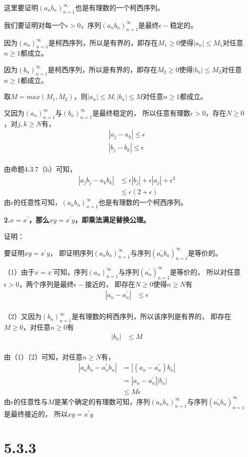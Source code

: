 \documentclass{article}
\theoremstyle{mystyle}
\begin{document}
这里要证明$(a_nb_n)_{n=1}^\infty$也是有理数的一个柯西序列。

我们要证明对每一个$\epsilon > 0$，序列$(a_nb_n)_{n=1}^\infty$是最终$\epsilon-$稳定的。

因为$(a_n)_{n=1}^\infty$是柯西序列，所以是有界的，即存在$M_1 \ge 0$使得$|a_n|\leq M_1$对任意$n \geq 1$都成立。

因为$(b_n)_{n=1}^\infty$是柯西序列，所以是有界的，即存在$M_2 \ge 0$使得$|b_n|\leq M_2$对任意$n \geq 1$都成立。

取$M=max(M_1,M_2)$，则$|a_n|\leq M, |b_n| \leq M$对任意$n \geq 1$都成立。

又因为$(a_n)_{n=1}^\infty$与$(b_n)_{n=1}^\infty$是最终稳定的，
所以任意有理数$\epsilon>0$，存在$N \geq 0$，对$j,k \geq N$有，
\begin{align*}
  |a_j - a_k| \leq \epsilon \\
  |b_j - b_k| \leq \epsilon \\
\end{align*}

由命题4.3.7（h）可知，
\begin{align*}
  |a_jb_j - a_kb_k| & \leq \epsilon|b_j| + \epsilon|a_j| + \epsilon^2 \\
                    & \leq \epsilon (2 + \epsilon)
\end{align*}
由$\epsilon$的任意性可知，$(a_nb_n)_{n=1}^\infty$也是有理数的一个柯西序列。

\textbf{2.$x=x^\prime$，那么$xy = x^\prime y$，即乘法满足替换公理。}

证明：

要证明$xy = x^\prime y$，
即证明序列$(a_nb_n)_{n=1}^\infty$与序列$(a^\prime_nb_n)_{n=1}^\infty$是等价的。

（1）由于$x=x^\prime$可知，序列$(a_n)_{n=1}^\infty$与序列$(a^\prime_n)_{n=1}^\infty$是等价的，
所以对任意$\epsilon > 0$，两个序列是最终$\epsilon -$接近的，
即存在$N \geq 0$使得$n \geq N$有
\begin{align*}
  |a_n - a^\prime_n| & \leq \epsilon \\
\end{align*}

（2）又因为$(b_n)_{n=1}^\infty$是有理数的柯西序列，所以该序列是有界的，
即存在$M \geq 0$，对任意$n \geq 0$有
\begin{align*}
  |b_n| & \leq M \\
\end{align*}

由（1）（2）可知，对任意$n \geq N$有，
\begin{align*}
  |a_nb_n - a^\prime_nb_n| & = |(a_n-a^\prime_n)b_n| \\
                           & = |a_n-a^\prime_n||b_n| \\
                           & \leq M \epsilon
\end{align*}
由$\epsilon$的任意性与$M$是某个确定的有理数可知，序列$(a_nb_n)_{n=1}^\infty$与序列$(a^\prime_nb_n)_{n=1}^\infty$是最终接近的，
所以$xy = x^\prime y$

\section*{5.3.3}
\end{document}
